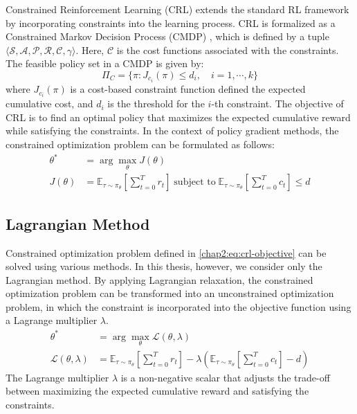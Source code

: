 Constrained Reinforcement Learning (CRL) extends the standard RL framework by incorporating constraints into the learning process.
CRL is formalized as a Constrained Markov Decision Process (CMDP) \cite{CMDP}, which is defined by a tuple $\langle \mathcal{S}, \mathcal{A}, \mathcal{P}, \mathcal{R}, \mathcal{C}, \gamma \rangle$.
Here, $\mathcal{C}$ is the cost functions associated with the constraints.
The feasible policy set in a CMDP is given by:
\begin{equation}
  \Pi_C = \{\pi: J_{c_i}(\pi) \leq d_i, \quad i = 1, \cdots, k\}
\end{equation}
where $J_{c_i}(\pi)$ is a cost-based constraint function defined the expected cumulative cost, and $d_i$ is the threshold for the $i$-th constraint.
The objective of CRL is to find an optimal policy that maximizes the expected cumulative reward while satisfying the constraints.
In the context of policy gradient methods, the constrained optimization problem can be formulated as follows:
\begin{equation} \label{chap2:eq:crl-objective}
  \begin{aligned}
    \theta^* &= \arg\max_\theta J(\theta) \\
    J(\theta) &= \mathbb{E}_{\tau \sim \pi_\theta} \left[ \sum^T_{t = 0} r_t \right] \; \text{subject to} \; \mathbb{E}_{\tau \sim \pi_\theta} \left[ \sum^T_{t = 0} c_t \right] \leq d
  \end{aligned}
\end{equation}

\subsection{Lagrangian Method}

Constrained optimization problem defined in \cref{chap2:eq:crl-objective} can be solved using various methods.
In this thesis, however, we consider only the Lagrangian method.
By applying Lagrangian relaxation, the constrained optimization problem can be transformed into an unconstrained optimization problem, in which the constraint is incorporated into the objective function using a Lagrange multiplier $\lambda$.
\begin{equation}
  \begin{aligned}
    \theta^* &= \arg\max_\theta \mathcal{L}(\theta, \lambda) \\
    \mathcal{L}(\theta, \lambda) &= \mathbb{E}_{\tau \sim \pi_\theta} \left[ \sum^T_{t = 0} r_t \right] - \lambda \left( \mathbb{E}_{\tau \sim \pi_\theta} \left[ \sum^T_{t = 0} c_t \right] - d \right)
  \end{aligned}
\end{equation}
The Lagrange multiplier $\lambda$ is a non-negative scalar that adjusts the trade-off between maximizing the expected cumulative reward and satisfying the constraints.


